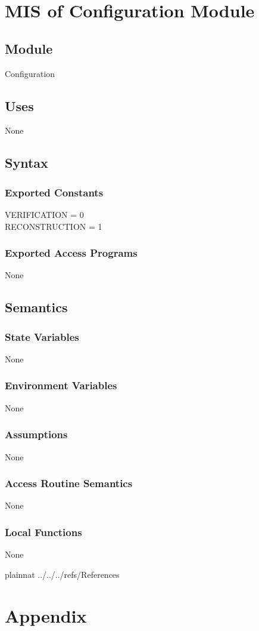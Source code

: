 \documentclass[12pt, titlepage]{article}
\begin{document}
\newpage
\section{MIS of Configuration Module} \label{Module}

\subsection{Module}
Configuration

\subsection{Uses}
None

\subsection{Syntax}

\subsubsection{Exported Constants}
VERIFICATION = 0\\
RECONSTRUCTION = 1\\

\subsubsection{Exported Access Programs}
None

\subsection{Semantics}

\subsubsection{State Variables}
None

\subsubsection{Environment Variables}
None

\subsubsection{Assumptions}
None

\subsubsection{Access Routine Semantics}
None

\subsubsection{Local Functions}
None

\newpage

 {plainnat}
 {../../../refs/References}

\newpage

\section{Appendix} \label{Appendix}

\end{document}
